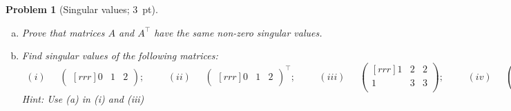 \documentclass[12pt,a4]{article}
\newtheorem{problem}{Problem}
\newcommand{\bu}{{\mathbf u}}
\newcommand{\bv}{{\mathbf v}}
\begin{document}
\begin{problem}[Singular values; 3~pt]\label{prb:4.2}\rm
\begin{enumerate}[(a)]
	\item Prove that matrices $A$ and $A^\top$ have the same non-zero singular values.
	\item Find singular values of the following matrices:
\[
    \begin{matrix} (i) \end{matrix} \quad
    \begin{pmatrix}[rrr]
        0 & 1 & 2
    \end{pmatrix};
    \qquad
    \begin{matrix} (ii) \end{matrix} \quad
	\begin{pmatrix}[rrr]
		0 & 1 & 2
	\end{pmatrix}^\top;
	\qquad
    \begin{matrix} (iii) \end{matrix} \quad
    \begin{pmatrix}[rrr]
        1 & 2 & 2 \\
        1 & 3 & 3 \\
    \end{pmatrix};
    \qquad
    \begin{matrix} (iv) \end{matrix} \quad
    \begin{pmatrix}[rr]
        2 &  0 \\
        1 & 2
    \end{pmatrix}.
\]
{\small \textsf{Hint:
		Use (a) in (i) and (iii)}}
\end{enumerate}
\end{problem}
\end{document}
